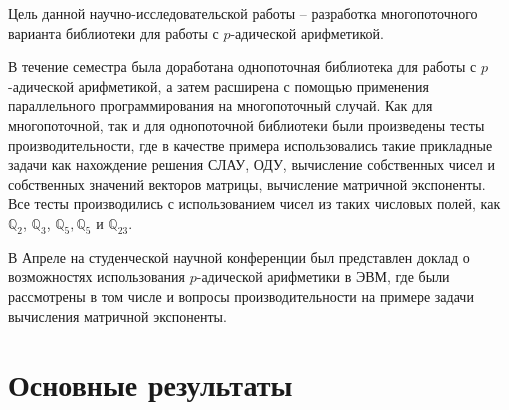 \documentclass[master, och, times, nir]{sty/SCWorks}
\begin{document}
\title{}


\author{Шарова Александра Вадимовича}

\date{2020}

\maketitle
\tableofcontents


\intro

Цель данной научно-исследовательской работы -- разработка многопоточного варианта библиотеки для работы с $p$-адической арифметикой.

В течение семестра была доработана однопоточная библиотека для работы с $p$-адической арифметикой, а затем расширена с помощью применения параллельного программирования на многопоточный случай. Как для многопоточной, так и для однопоточной библиотеки были произведены тесты производительности, где в качестве примера использовались такие прикладные задачи как нахождение решения СЛАУ, ОДУ, вычисление собственных чисел и собственных значений векторов матрицы, вычисление матричной экспоненты. Все тесты производились с использованием чисел из таких числовых полей, как $\mathbb{Q}_2$, $\mathbb{Q}_3$, $\mathbb{Q}_5, \mathbb{Q}_5$ и $\mathbb{Q}_{23}$.

В Апреле на студенческой научной конференции был представлен доклад о возможностях использования $p$-адической арифметики в ЭВМ, где были рассмотрены в том числе и вопросы производительности на примере задачи вычисления матричной экспоненты.

\section{Основные результаты}
\end{document}
